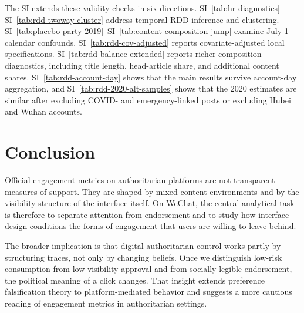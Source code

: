 \documentclass[12pt, american]{article}
\begin{document}
\begin{refsection}
The SI extends these validity checks in six directions. SI~\ref{tab:hr-diagnostics}--SI~\ref{tab:rdd-twoway-cluster} address temporal-RDD inference and clustering. SI~\ref{tab:placebo-party-2019}--SI~\ref{tab:content-composition-jump} examine July 1 calendar confounds. SI~\ref{tab:rdd-cov-adjusted} reports covariate-adjusted local specifications. SI~\ref{tab:rdd-balance-extended} reports richer composition diagnostics, including title length, head-article share, and additional content shares. SI~\ref{tab:rdd-account-day} shows that the main results survive account-day aggregation, and SI~\ref{tab:rdd-2020-alt-samples} shows that the 2020 estimates are similar after excluding COVID- and emergency-linked posts or excluding Hubei and Wuhan accounts.

\section{Conclusion}

Official engagement metrics on authoritarian platforms are not transparent measures of support. They are shaped by mixed content environments and by the visibility structure of the interface itself. On WeChat, the central analytical task is therefore to separate attention from endorsement and to study how interface design conditions the forms of engagement that users are willing to leave behind.

The broader implication is that digital authoritarian control works partly by structuring traces, not only by changing beliefs. Once we distinguish low-risk consumption from low-visibility approval and from socially legible endorsement, the political meaning of a click changes. That insight extends preference falsification theory to platform-mediated behavior and suggests a more cautious reading of engagement metrics in authoritarian settings.




\newpage                  %
\begingroup               %
  \singlespacing          %
  \setlength\bibitemsep{0pt}  %
  \printbibliography
\endgroup





\end{refsection}
\end{document}
